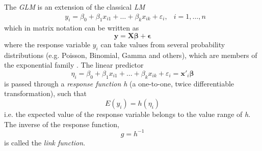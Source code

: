 The \textit{\ac{GLM}} is an extension of the classical \textit{\ac{LM}}
$$
\begin{aligned}
&y_{i}=\beta_{0}+\beta_{1} x_{i 1}+\ldots+\beta_{k} x_{i k}+\varepsilon_{i}, &i=1, \ldots, n
\end{aligned}
$$
which in matrix notation can be written as
$$ \bm{y} = \bm{X}\bm{\beta} + \bm{\epsilon} $$
where the response variable $y_i$ can take values from several probability distributions (e.g. Poisson, Binomial, Gamma and others), which are members of the exponential family \cite{fahrmeir2003regression}. The linear predictor 
\begin{equation} 
\eta_i = \beta_{0}+\beta_{1} x_{i 1}+\ldots+\beta_{k} x_{i k}+\varepsilon_{i} = \bm{x'}_i \bm{\beta}
\label{eq:linear_predictor_glm}
\end{equation}
is passed through a \textit{response function h} (a one-to-one, twice differentiable transformation), such that
$$ E(y_i) = h(\eta_i)$$
i.e. the expected value of the response variable belongs to the value range of \textit{h}. The inverse of the response function, 
$$g = h^{-1}$$ is called the \textit{link function}.




